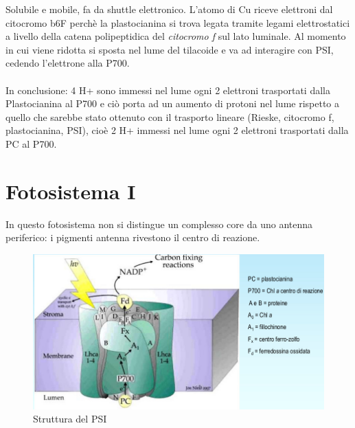 \documentclass[a4paper,12pt]{book}
\begin{document}
Solubile e mobile, fa da shuttle elettronico. L'atomo di Cu riceve elettroni dal citocromo b6F perchè la plastocianina si trova legata tramite legami elettrostatici a livello della catena polipeptidica del \emph{citocromo f} sul lato luminale. Al momento in cui viene ridotta si sposta nel lume del tilacoide e va ad interagire con PSI, cedendo l'elettrone alla P700.
\paragraph{}
 In conclusione: 4 H+ sono immessi nel lume ogni 2 elettroni trasportati dalla Plastocianina al P700 e ciò porta ad un aumento di
protoni nel lume rispetto a quello che sarebbe stato ottenuto con il trasporto lineare (Rieske, citocromo f, plastocianina,
PSI), cioè 2 H+ immessi nel lume ogni 2 elettroni trasportati dalla PC al P700.
   
\section{Fotosistema I}
In questo fotosistema non si distingue un complesso core da uno antenna periferico: i pigmenti antenna rivestono il centro di reazione.
\begin{figure}[H]
\centering
\includegraphics[scale=0.35]{immagini/PSI.jpg}
\caption{Struttura del PSI}
\end{figure}
\end{document}
